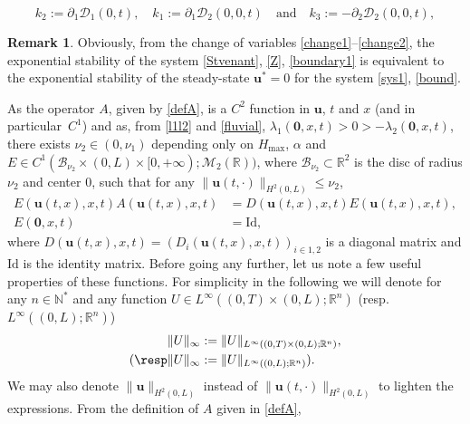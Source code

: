 \documentclass[JEP,XML,SOM,Unicode]{cedram}
\let\mathcal\mathscr
\theoremstyle{definition}
\newtheorem{rmk}[thm]{Remark}
\begin{document}
\[
k_{2}:=\partial_{1} \mathcal{D}_{1}(0,t),\quad k_{1}:=\partial_{1}\mathcal{D}_{2}(0,0,t)\quad\text{and}\quad k_{3}:=-\partial_{2}\mathcal{D}_{2}(0,0,t),
\]
\begin{rmk}
Obviously, from the change of variables \eqref{change1}--\eqref{change2}, the exponential stability of
the system \eqref{Stvenant}, \eqref{Z}, \eqref{boundary1}
is equivalent to the exponential stability of the steady-state $\boldsymbol{u}^{*}=0$ for the system \eqref{sys1}, \eqref{bound}.
\label{r1}
\end{rmk}
As the operator $A$, given by \eqref{defA}, is a {$C^{2}$ function in $\boldsymbol{u}$,
$t$ and $x$ (and {in particular~$C^{1}$})}
and as, from \eqref{l1l2} and \eqref{fluvial}, $\lambda_{1}(\boldsymbol{0},x,t)>0>-\lambda_{2}(\boldsymbol{0},x,t)$,
there exists $\nu_{2}\in(0,\nu_{1})$ {depending only on $H_{\max}$, $\alpha$}
and $E\in C^{1}(\mathcal{B}_{\nu_{2}}\times(0,L)\times[0,+\infty);\mathcal{M}_{2}(\mathbb{R}))$, where
$\mathcal{B}_{\nu_{2}}\subset\mathbb{R}^{2}$ is the disc of radius $\nu_{2}$ and center $0$,
such that
for any $\lVert\boldsymbol{u}(t,\cdot)\rVert_{H^{2}(0,L)}\leq \nu_{2}$,
\begin{equation}
\begin{split}
E(\boldsymbol{u}(t,x),x,t)A(\boldsymbol{u}(t,x),x,t)&=D(\boldsymbol{u}(t,x),x,t)E(\boldsymbol{u}(t,x),x,t),\\
E(\boldsymbol{0},x,t)&=\mathrm{Id},
\end{split}
\label{definv}
\end{equation}
where $D(\boldsymbol{u}(t,x),x,t)=(D_{i}(\boldsymbol{u}(t,x),x,t))_{i\in{1,2}}$ is a diagonal matrix and $\mathrm{Id}$ is the identity matrix.
Before going any further, let us
note a few useful properties of these functions. {For simplicity in the following we will denote for any $n\in\mathbb{N}^{*}$ and any function $U\in L^{\infty}((0,T)\times(0,L);\mathbb{R}^{n})$ (resp. $L^{\infty}((0,L);\mathbb{R}^{n})$)
\begin{equation*}
\begin{split}
\lVert U\rVert_{\infty}&:=\lVert U\rVert_{L^{\infty}((0,T)\times(0,L);\mathbb{R}^{n})},\\
(\resp\lVert U\rVert_{\infty}&:=\lVert U\rVert_{L^{\infty}((0,L);\mathbb{R}^{n})}).
\end{split}
\end{equation*}
We may also denote $\lVert\boldsymbol{u}\rVert_{H^{2}(0,L)}$ instead of $\lVert\boldsymbol{u}(t,\cdot)\rVert_{H^{2}(0,L)}$ to lighten the expressions.}
From the definition of $A$ given in \eqref{defA},
\end{document}
